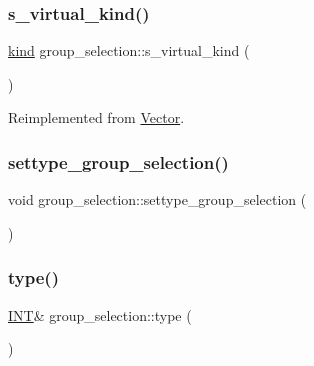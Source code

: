 \mbox{\label{classgroup__selection_a21d7be997a2787d8a1284696b01038e8}} 
\subsubsection{\texorpdfstring{s\+\_\+virtual\+\_\+kind()}{s\_virtual\_kind()}}
{\footnotesize\ttfamily \mbox{\hyperlink{discreta_8h_aaf25ee7e2306d78c74ec7bc48f092e81}{kind}} group\+\_\+selection\+::s\+\_\+virtual\+\_\+kind (\begin{DoxyParamCaption}{ }\end{DoxyParamCaption})\hspace{0.3cm}{\ttfamily [virtual]}}



Reimplemented from \mbox{\hyperlink{class_vector_a20550e70d02cbe484032c7f6b0833a0f}{Vector}}.

\mbox{\label{classgroup__selection_a015ed73b7b8d784bedd4d11ac1fc0ec1}} 
\subsubsection{\texorpdfstring{settype\+\_\+group\+\_\+selection()}{settype\_group\_selection()}}
{\footnotesize\ttfamily void group\+\_\+selection\+::settype\+\_\+group\+\_\+selection (\begin{DoxyParamCaption}{ }\end{DoxyParamCaption})}

\mbox{\label{classgroup__selection_a7d7efa588eae53bc12ab0cc6a45fad31}} 
\subsubsection{\texorpdfstring{type()}{type()}}
{\footnotesize\ttfamily \mbox{\hyperlink{galois_8h_a09fddde158a3a20bd2dcadb609de11dc}{I\+NT}}\& group\+\_\+selection\+::type (\begin{DoxyParamCaption}{ }\end{DoxyParamCaption})\hspace{0.3cm}{\ttfamily [inline]}}

